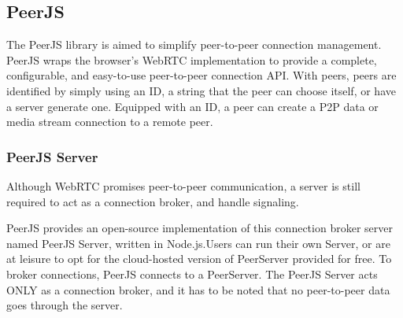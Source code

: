 \subsection{PeerJS}

The PeerJS library is aimed to simplify peer-to-peer connection management. 
PeerJS wraps the browser's WebRTC implementation to provide a complete, configurable, 
and easy-to-use peer-to-peer connection API. 
With peers, peers are identified by simply using an ID, a string that the peer 
can choose itself, or have a server generate one. 
Equipped with an ID, a peer can create a P2P data or media stream connection to a remote peer.~\cite{PeerJSsimplifiesWebRTC}

\subsubsection{PeerJS Server}

Although WebRTC promises peer-to-peer communication, a server is still required to 
act as a connection broker, and handle signaling.

PeerJS provides an open-source implementation of this connection broker server named PeerJS Server, written in Node.js.Users can run their own Server, 
or are at leisure to opt for the cloud-hosted version of PeerServer provided for free.
To broker connections, PeerJS connects to a PeerServer. The PeerJS Server acts ONLY as a connection broker, and it has to be noted that no peer-to-peer data goes through the server.~\cite{TamingWebRTCwithPeerJS}
